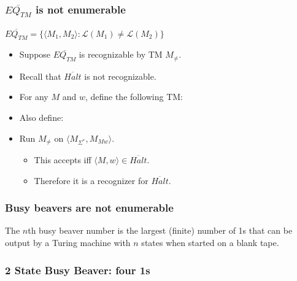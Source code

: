 \documentclass{beamer}
\newcommand{\bfr}[1]{\begin{frame}[fragile]\frametitle{{ #1 }}}
\newcommand{\pth}[5]{\path (#1) edge node {$\frac{#2}{#3 #4}$} (#5); }
\newcommand{\pthl}[5]{\path (#1) edge [bend left] node {$\frac{#2}{#3 #4}$} (#5); }
\begin{document}
\bfr{$\overline{EQ_{TM}}$ is not enumerable}
$\overline{EQ_{TM}} = \{\langle M_1, M_2\rangle:
\mathcal{L}(M_1) \not= \mathcal{L}(M_2) \}$
\begin{itemize}
\item Suppose $\overline{EQ_{TM}}$ is recognizable by TM $M_{\neq}$.
\item
  Recall that $\overline{Halt}$ is not recognizable.
\item
  For any $M$ and $w$, define the following TM:
\item Also define:
  

\item Run $M_{\neq}$ on $\langle M_{\Sigma^*}, M_{Mw}\rangle$.
  \begin{itemize}
\item This accepts iff $\langle M,w\rangle\in\overline{Halt}$.
\item Therefore it is a recognizer for $\overline{Halt}$.
  \end{itemize}

\end{itemize}


\end{frame}


\bfr{Busy beavers are not enumerable} The $n$th busy beaver number is
the largest (finite) number of 1s that can be output by a Turing
machine with $n$ states when started on a blank tape.
\end{frame}


\bfr{2 State Busy Beaver: four 1s}
 
\end{frame}
\end{document}
